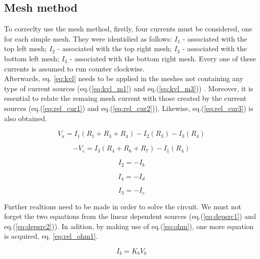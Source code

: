 \subsection{Mesh method}
\label{subsec:mesh_met}

To correclty use the mesh method, firstly, four currents must be considered, one for each simple mesh.
They were identidied as follows: $I_1$ - associated with the top left mesh; $I_2$ - associated with
the top right mesh; $I_3$ - associated with the bottom left mesh; $I_4$ - associated with the bottom
right mesh. Every one of these currents is assumed to run counter clockwise. \\

Afterwards, eq. \ref{eq:kvl} needs to be applied in the meshes not containing any type of current
sources (eq.(\ref{eq:kvl_m1}) and eq.(\ref{eq:kvl_m3})) . Moreover, it is essential to relate the
remaing mesh current with those created by the current sources (eq.(\ref{eq:rel_cur1}) and
eq.(\ref{eq:rel_cur2})). Likewise, eq.(\ref{eq:rel_cur3}) is also obtained.

\begin{equation}
	V_a = I_1(R_1+R_3+R_4)-I_2(R_3)-I_3(R_4)
	\label{eq:kvl_m1}
\end{equation}

\begin{equation}
	-V_c = I_3(R_4+R_6+R_7)-I_1(R_4)
	\label{eq:kvl_m3}
\end{equation}

\begin{equation}
	I_2 = -I_b
	\label{eq:rel_cur1}
\end{equation}

\begin{equation}
	I_4 = -I_d
	\label{eq:rel_cur2}
\end{equation}

\begin{equation}
	I_3 = -I_c
	\label{eq:rel_cur3}
\end{equation}

Further realtions need to be made in order to solve the circuit. We must not forget the two equations
from the linear dependent sources (eq.(\ref{eq:depsrc1}) and eq.(\ref{eq:depsrc2})). In adition, by
making use of eq.(\ref{eq:ohm}), one more equation is acquired, eq. \ref{eq:rel_ohm1}.

\begin{equation}
	I_b = K_bV_b
	\label{eq:depsrc1}
\end{equation}

